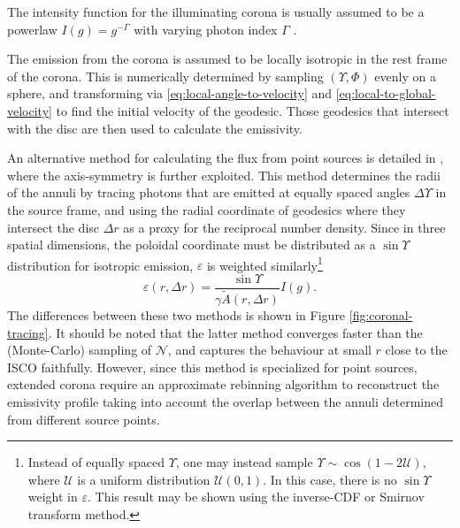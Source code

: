 The intensity function for the illuminating corona is usually assumed to be a powerlaw $I(g) = g^{-\Gamma}$ with varying photon index $\Gamma$ \citep{gonzalez_probing_2017}.

The emission from the corona is assumed to be locally isotropic in the rest frame of the corona. This is numerically determined by sampling $(\Upsilon, \Phi)$ evenly on a sphere, and transforming via \eqref{eq:local-angle-to-velocity} and \eqref{eq:local-to-global-velocity} to find the initial velocity of the geodesic. Those geodesics that intersect with the disc are then used to calculate the emissivity.

An alternative method for calculating the flux from point sources is detailed in \cite{dauser_irradiation_2013}, where the axis-symmetry is further exploited. This method determines the radii of the annuli by tracing photons that are emitted at equally spaced angles $\Delta \Upsilon$ in the source frame, and using the radial coordinate of geodesics where they intersect the disc $\Delta r$ as a proxy for the reciprocal number density. Since in three spatial dimensions, the poloidal coordinate must be distributed as a $\sin \Upsilon$ distribution for isotropic emission, $\varepsilon$ is weighted similarly\footnote{Instead of equally spaced $\Upsilon$, one may instead sample $\Upsilon \sim \cos (1 - 2 \mathcal{U})$, where $\mathcal{U}$ is a uniform distribution $\mathcal{U}(0,1)$. In this case, there is no $\sin \Upsilon$ weight in $\varepsilon$. This result may be shown using the inverse-CDF or Smirnov transform method.}
\begin{equation}
    \varepsilon(r, \Delta r) = \frac{\sin \Upsilon}{\gamma \tilde{A}(r, \Delta r)} I(g).
\end{equation}
The differences between these two methods is shown in Figure \ref{fig:coronal-tracing}. It should be noted that the latter method converges faster than the (Monte-Carlo) sampling of $\mathcal{N}$, and captures the behaviour at small $r$ close to the ISCO faithfully. However, since this method is specialized for point sources, extended corona require an approximate rebinning algorithm to reconstruct the emissivity profile taking into account the overlap between the annuli determined from different source points.

